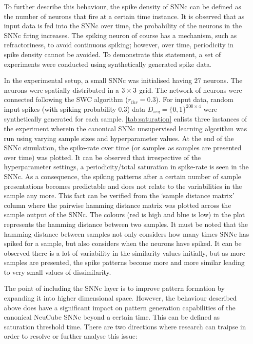 To further describe this behaviour, the spike density of SNNc can be defined as the number of neurons that fire at a certain time instance. It is observed that as input data is fed into the SNNc over time, the probability of the neurons in the SNNc firing increases. The spiking neuron of course has a mechanism, such as refractoriness, to avoid continuous spiking; however, over time, periodicity in spike density cannot be avoided. To demonstrate this statement, a set of experiments were conducted using synthetically generated spike data. 

In the experimental setup, a small SNNc was initialised having $27$ neurons. The neurons were spatially distributed in a $3\times 3\time 3$ grid. The network of neurons were connected following the SWC algorithm ($r_{thr}=0.3$). For input data, random input spikes (with spiking probability $0.3$) data $D_{seq}=\{0, 1\}^{200\times 4}$ were synthetically generated for each sample. \tablename \ref{tab:saturation} enlists three instances of the experiment wherein the canonical SNNc unsupervised learning algorithm was run using varying sample sizes and hyperparameter values. At the end of the SNNc simulation, the spike-rate over time (or samples as samples are presented over time) was plotted. It can be observed that irrespective of the hyperparameter settings, a periodicity/total saturation in spike-rate is seen in the SNNc. As a consequence, the spiking patterns after a certain number of sample presentations becomes predictable and does not relate to the variabilities in the sample any more. This fact can be verified from the `sample distance matrix' column where the pairwise hamming distance matrix was plotted across the sample output of the SNNc. The colours (red is high and blue is low) in the plot represents the hamming distance between two samples. It must be noted that the hamming distance between samples not only considers how many times SNNc has spiked for a sample, but also considers when the neurons have spiked. It can be observed there is a lot of variability in the similarity values initially, but as more samples are presented, the spike patterns become more and more similar leading to very small values of dissimilarity. 

The point of including the SNNc layer is to improve pattern formation by expanding it into higher dimensional space. However, the behaviour described above does have a significant impact on pattern generation capabilities of the canonical NeuCube SNNc beyond a certain time. This can be defined as saturation threshold time. There are two directions where research can traipse in order to resolve or further analyse this issue:

